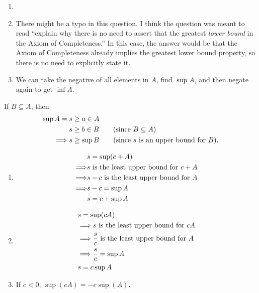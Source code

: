 \begin{exercise}
\begin{enumerate}[label=(\alph*)]
	\item \TODO
	\item There might be a typo in this question. I think the question was meant to read ``explain why there is no need to assert that the greatest \textit{lower bound} in the Axiom of Completeness.'' In this case, the answer would be that the Axiom of Completeness already implies the greatest lower bound property, so there is no need to explicitly state it.
	\item We can take the negative of all elements in $A$, find $\sup A$, and then negate again to get $\inf A$.
\end{enumerate}
\end{exercise}

\begin{exercise}
	If $B \subseteq A$, then 
	\begin{align*}
		\sup A = s &\geq a \in A \\
			s &\geq b \in B \tag{since $B\subseteq A$} \\
			\Longrightarrow s &\geq \sup B \tag{since $s$ is an upper bound for $B$}.
	\end{align*}
\end{exercise}

\begin{exercise}
	\begin{enumerate}[label=(\alph*)]
		\item \begin{align*}
		&s = \sup(c + A) \\
		\Longrightarrow &s \text{ is the least upper bound for } c + A \\
		\Longrightarrow &s - c \text{ is the least upper bound for } A \\
		\Longrightarrow &s - c = \sup A \\
		&s = c + \sup A
	\end{align*}
		\item \begin{align*}
			&s = \sup(cA) \\
			&\Longrightarrow s \text{ is the least upper bound for } cA \\
			&\Longrightarrow \frac{s}{c} \text{ is the least upper bound for } A \\
			&\Longrightarrow \frac{s}{c} = \sup A \\
			&s = c \sup A
		\end{align*}
		\item If $c < 0$, $\sup(cA) = -c\sup(A)$.
	\end{enumerate}
\end{exercise}

